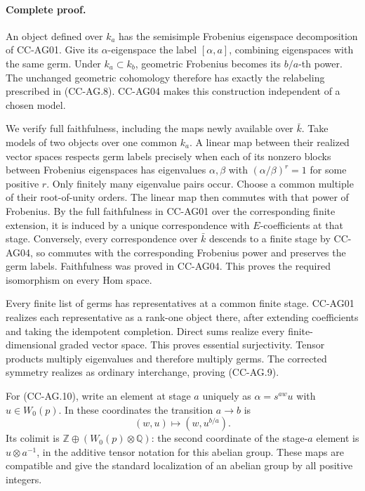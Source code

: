 \paragraph{Complete proof.}
An object defined over \(k_a\) has the semisimple Frobenius
eigenspace decomposition of CC-AG01. Give its \(\alpha\)-eigenspace
the label \([\alpha,a]\), combining eigenspaces with the same germ.
Under \(k_a\subset k_b\), geometric Frobenius becomes its
\(b/a\)-th power. The unchanged geometric cohomology therefore
has exactly the relabeling prescribed in (CC-AG.8).
CC-AG04 makes this construction independent of a chosen model.

We verify full faithfulness, including the maps newly available
over \(\bar k\). Take models of two objects over one common \(k_a\).
A linear map between their realized vector spaces respects germ
labels precisely when each of its nonzero blocks between
Frobenius eigenspaces has eigenvalues \(\alpha,\beta\) with
\((\alpha/\beta)^r=1\) for some positive \(r\). Only finitely many
eigenvalue pairs occur. Choose a common multiple of their
root-of-unity orders. The linear map then commutes with that
power of Frobenius. By the full faithfulness in CC-AG01 over the
corresponding finite extension, it is induced by a unique
correspondence with \(E\)-coefficients at that stage. Conversely,
every correspondence over \(\bar k\) descends to a finite stage
by CC-AG04, so commutes with the corresponding Frobenius power
and preserves the germ labels. Faithfulness was proved in
CC-AG04. This proves the required isomorphism on every Hom space.

Every finite list of germs has representatives at a common finite
stage. CC-AG01 realizes each representative as a rank-one object
there, after extending coefficients and taking the idempotent
completion. Direct sums realize every finite-dimensional graded
vector space. This proves essential surjectivity. Tensor products
multiply eigenvalues and therefore multiply germs. The corrected
symmetry realizes as ordinary interchange, proving (CC-AG.9).

For (CC-AG.10), write an element at stage \(a\) uniquely as
\(\alpha=s^{aw}u\) with \(u\in W_0(p)\). In these coordinates the
transition \(a\to b\) is
\[
 (w,u)\longmapsto(w,u^{b/a}).
\]
Its colimit is \(\mathbb Z\oplus(W_0(p)\otimes\mathbb Q)\):
the second coordinate of the stage-\(a\) element is
\(u\otimes a^{-1}\), in the additive tensor notation for this
abelian group. These maps are compatible and give the standard
localization of an abelian group by all positive integers.

